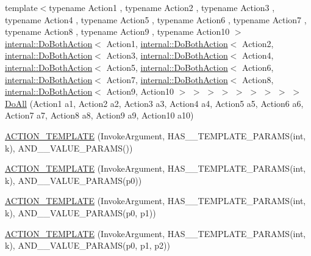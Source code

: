 \begin{DoxyCompactItemize}
{\footnotesize template$<$typename Action1 , typename Action2 , typename Action3 , typename Action4 , typename Action5 , typename Action6 , typename Action7 , typename Action8 , typename Action9 , typename Action10 $>$ }\\\mbox{\hyperlink{classtesting_1_1internal_1_1DoBothAction}{internal\+::\+Do\+Both\+Action}}$<$ Action1, \mbox{\hyperlink{classtesting_1_1internal_1_1DoBothAction}{internal\+::\+Do\+Both\+Action}}$<$ Action2, \mbox{\hyperlink{classtesting_1_1internal_1_1DoBothAction}{internal\+::\+Do\+Both\+Action}}$<$ Action3, \mbox{\hyperlink{classtesting_1_1internal_1_1DoBothAction}{internal\+::\+Do\+Both\+Action}}$<$ Action4, \mbox{\hyperlink{classtesting_1_1internal_1_1DoBothAction}{internal\+::\+Do\+Both\+Action}}$<$ Action5, \mbox{\hyperlink{classtesting_1_1internal_1_1DoBothAction}{internal\+::\+Do\+Both\+Action}}$<$ Action6, \mbox{\hyperlink{classtesting_1_1internal_1_1DoBothAction}{internal\+::\+Do\+Both\+Action}}$<$ Action7, \mbox{\hyperlink{classtesting_1_1internal_1_1DoBothAction}{internal\+::\+Do\+Both\+Action}}$<$ Action8, \mbox{\hyperlink{classtesting_1_1internal_1_1DoBothAction}{internal\+::\+Do\+Both\+Action}}$<$ Action9, Action10 $>$ $>$ $>$ $>$ $>$ $>$ $>$ $>$ $>$ \mbox{\hyperlink{namespacetesting_a79ac222c485c7aa0a1774bee17dadb10}{Do\+All}} (Action1 a1, Action2 a2, Action3 a3, Action4 a4, Action5 a5, Action6 a6, Action7 a7, Action8 a8, Action9 a9, Action10 a10)
\item 
\mbox{\hyperlink{namespacetesting_a8a02397c7fdf8e84d559ab72dcc28eb1}{A\+C\+T\+I\+O\+N\+\_\+\+T\+E\+M\+P\+L\+A\+TE}} (Invoke\+Argument, H\+A\+S\+\_\+\_\+\+T\+E\+M\+P\+L\+A\+T\+E\+\_\+\+P\+A\+R\+A\+MS(int, k), A\+N\+D\+\_\+\_\+\+V\+A\+L\+U\+E\+\_\+\+P\+A\+R\+A\+MS())
\item 
\mbox{\hyperlink{namespacetesting_afaa0d88f5442f9aee5d6147377d3e50c}{A\+C\+T\+I\+O\+N\+\_\+\+T\+E\+M\+P\+L\+A\+TE}} (Invoke\+Argument, H\+A\+S\+\_\+\_\+\+T\+E\+M\+P\+L\+A\+T\+E\+\_\+\+P\+A\+R\+A\+MS(int, k), A\+N\+D\+\_\+\_\+\+V\+A\+L\+U\+E\+\_\+\+P\+A\+R\+A\+MS(p0))
\item 
\mbox{\hyperlink{namespacetesting_a39bf6c49dc1323cc9539a12249e60aba}{A\+C\+T\+I\+O\+N\+\_\+\+T\+E\+M\+P\+L\+A\+TE}} (Invoke\+Argument, H\+A\+S\+\_\+\_\+\+T\+E\+M\+P\+L\+A\+T\+E\+\_\+\+P\+A\+R\+A\+MS(int, k), A\+N\+D\+\_\+\_\+\+V\+A\+L\+U\+E\+\_\+\+P\+A\+R\+A\+MS(p0, p1))
\item 
\mbox{\hyperlink{namespacetesting_ac50647216fdf5197899a3d5034a9a670}{A\+C\+T\+I\+O\+N\+\_\+\+T\+E\+M\+P\+L\+A\+TE}} (Invoke\+Argument, H\+A\+S\+\_\+\_\+\+T\+E\+M\+P\+L\+A\+T\+E\+\_\+\+P\+A\+R\+A\+MS(int, k), A\+N\+D\+\_\+\_\+\+V\+A\+L\+U\+E\+\_\+\+P\+A\+R\+A\+MS(p0, p1, p2))

\end{DoxyCompactItemize}
